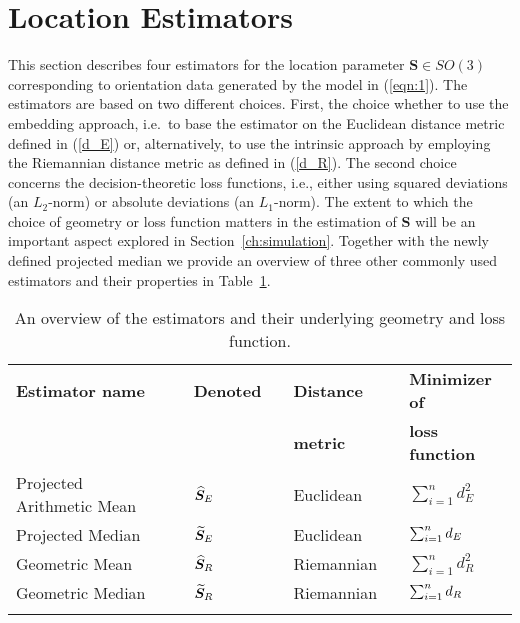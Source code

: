 \section{Location Estimators}\label{sec:estimators}
This section describes four estimators for the location parameter $\bm{S}\in SO(3)$ corresponding to orientation data generated by the model in (\ref{eqn:1}). The estimators are based on two different choices. First, the choice whether to use the embedding approach, i.e.~to base the estimator on the Euclidean distance metric  defined in (\ref{d_E}) or, alternatively, to use the intrinsic approach by employing the Riemannian distance metric as defined in (\ref{d_R}). The second choice concerns the decision-theoretic loss functions, i.e., either using squared deviations  (an $L_2$-norm) or  absolute deviations (an $L_1$-norm).  The extent to which the choice of geometry or loss function matters in the estimation of $\bm{S}$ will be an important aspect explored in Section~\ref{ch:simulation}.  Together with the newly defined projected median we provide an overview of three other commonly used estimators and their properties in Table~\ref{tab:ests.sum}.

\begin{table}[h]
\caption{An overview of the estimators and their underlying geometry and loss function.}  \label{tab:ests.sum}
\centering
\begin{tabular}{ lclclcl}\hline
\rule[2mm]{0mm}{1mm} \textbf{Estimator name} & & \textbf{Denoted} & & \textbf{Distance} &&\textbf{Minimizer of}\\ 
\rule[2mm]{0mm}{1mm}  & &  & & \textbf{metric} &&\textbf{loss function}\\ 
\hline \hline 
\rule[2mm]{0mm}{6mm} Projected Arithmetic Mean & & ${\widehat{\bm S}_E}$ & & Euclidean &&$\sum_{i=1}^n d^2_E$  \\
\rule[2mm]{0mm}{6mm} Projected Median & & ${\widetilde{\bm S}_E}$ & & Euclidean && $\sum_{i=1}^n{d_E}$ \\
\rule[2mm]{0mm}{6mm} Geometric Mean & & ${\widehat{\bm S}_R}$&  & Riemannian && $\sum_{i=1}^n d^2_R$\\
\rule[2mm]{0mm}{6mm} Geometric Median & & ${\widetilde{\bm S}_R}$&  & Riemannian &&$\sum_{i=1}^n{d_R}$ \\[-7mm] 
\rule[2mm]{0mm}{6mm} & & & & \\ \hline
\end{tabular}
\end{table}

